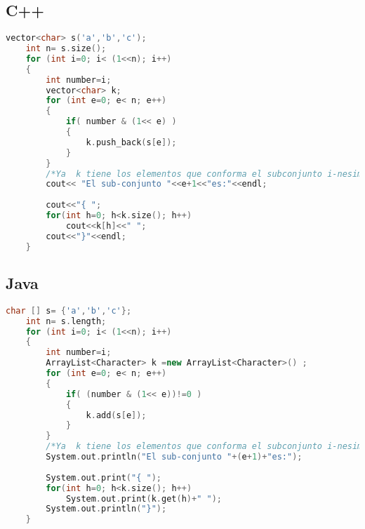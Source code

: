 \subsection{C++}
\lstset{language=C++, breaklines=true, basicstyle=\footnotesize}
\begin{lstlisting}[language=C++]
	vector<char> s('a','b','c');
	int n= s.size();
	for (int i=0; i< (1<<n); i++)
	{
		int number=i;
		vector<char> k;
		for (int e=0; e< n; e++)
		{
			if( number & (1<< e) )
			{
				k.push_back(s[e]);
			}
		}
		/*Ya  k tiene los elementos que conforma el subconjunto i-nesimo*/
		cout<< "El sub-conjunto "<<e+1<<"es:"<<endl;
		
		cout<<"{ ";
		for(int h=0; h<k.size(); h++)
		    cout<<k[h]<<" ";	
		cout<<"}"<<endl;	
	}
\end{lstlisting}

\subsection{Java}
\begin{lstlisting}[language=C++]
	char [] s= {'a','b','c'};
	int n= s.length;
	for (int i=0; i< (1<<n); i++)
	{
		int number=i;
		ArrayList<Character> k =new ArrayList<Character>() ;
		for (int e=0; e< n; e++)
		{
			if( (number & (1<< e))!=0 )
			{
				k.add(s[e]);
			}
		}
		/*Ya  k tiene los elementos que conforma el subconjunto i-nesimo*/
		System.out.println("El sub-conjunto "+(e+1)+"es:");
		
		System.out.print("{ ");
		for(int h=0; h<k.size(); h++)
			System.out.print(k.get(h)+" ");	
		System.out.println("}");	
	}
\end{lstlisting}

